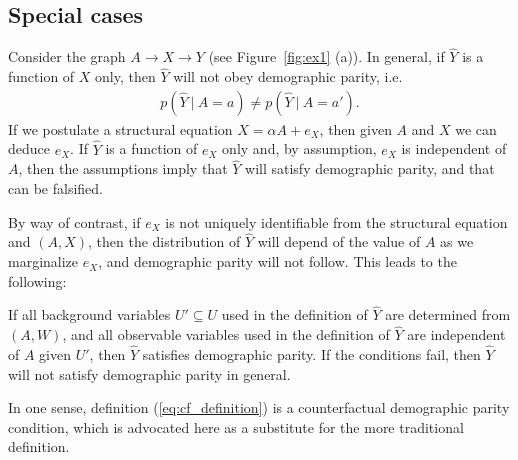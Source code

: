 \subsection{Special cases}
%
Consider the graph $A \rightarrow X \rightarrow Y$ (see
Figure~\ref{fig:ex1} (a)). In general, if $\hat Y$ is a function of
$X$ only, then $\hat Y$ will not obey demographic parity, i.e.
\begin{align}
  p(\hat Y\ |\ A = a) \neq p(\hat Y\ |\ A = a').\nonumber
\end{align}
If we postulate a
structural equation $X = \alpha A + e_X$, then given $A$ and $X$ we
can deduce $e_X$. If $\hat Y$ is a function of $e_X$ only and, by
assumption, $e_X$ is independent of $A$, then the assumptions imply
that $\hat Y$ will satisfy demographic parity, and that can be
falsified.

By way of contrast, if $e_X$ is not uniquely identifiable from the structural equation and $(A, X)$, then the distribution of $\hat Y$ will depend of the value of $A$ as we marginalize $e_X$, and demographic parity will not follow. This leads to the following:

\begin{lem}
If all background variables $U' \subseteq U$ used in the definition of $\hat Y$ are determined from $(A, W)$, and all observable variables used in the definition of $\hat Y$ are independent of $A$ given $U'$, then $\hat Y$ satisfies demographic parity. If the conditions fail, then $\hat Y$ will not satisfy demographic parity in general. 
\end{lem}
  
In one sense, definition (\ref{eq:cf_definition}) is a counterfactual demographic parity condition, which is advocated here as a substitute for the more traditional definition.

